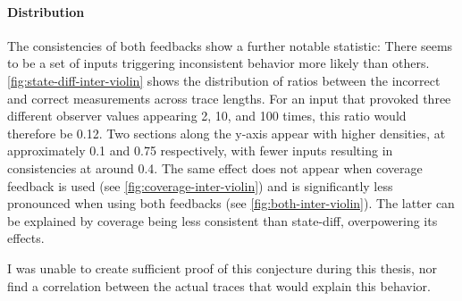 \documentclass[twocolumn]{article}
\begin{document}
\paragraph{Distribution}


The consistencies of both feedbacks show a further notable statistic: There seems to be a set of inputs triggering inconsistent behavior more likely than others. \cref{fig:state-diff-inter-violin} shows the distribution of ratios between the incorrect and correct measurements across trace lengths. For an input that provoked three different observer values appearing 2, 10, and 100 times, this ratio would therefore be 0.12. Two sections along the y-axis appear with higher densities, at approximately 0.1 and 0.75 respectively, with fewer inputs resulting in consistencies at around 0.4. The same effect does not appear when coverage feedback is used (see \cref{fig:coverage-inter-violin}) and is significantly less pronounced when using both feedbacks (see \cref{fig:both-inter-violin}). The latter can be explained by coverage being less consistent than state-diff, overpowering its effects.

I was unable to create sufficient proof of this conjecture during this thesis, nor find a correlation between the actual traces that would explain this behavior.
\end{document}
